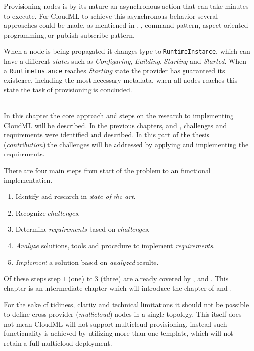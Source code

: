 Provisioning nodes is by its nature an asynchronous action that can take minutes to execute.
For CloudML to achieve this asynchronous behavior several approaches could be made,
as mentioned in , \eg, command pattern, aspect-oriented programming,
or publish-subscribe pattern.

When a node is being propagated it changes type to \texttt{RuntimeInstance}, 
which can have a different \emph{states} such as \emph{Configuring}, \emph{Building}, \emph{Starting} and \emph{Started}.
When a \texttt{RuntimeInstance} reaches \emph{Starting} state the provider has guaranteed its existence, including
the most necessary metadata, when all nodes reaches this state the task of provisioning is concluded.

\hr 

 \\
In this chapter the core approach and steps on the research to implementing CloudML will be described.
In the previous chapters,  and , 
challenges and requirements were identified and described.
In this part of the thesis (\emph{contribution}) the challenges will be addressed 
by applying and implementing the requirements.

There are four main steps from start of the problem to an functional implementation.
\begin{enumerate}
  \item Identify and research in \emph{state of the art}.
  \item Recognize \emph{challenges}.
  \item Determine \emph{requirements} based on \emph{challenges}.
  \item \emph{Analyze} solutions, tools and procedure to implement \emph{requirements}.
  \item \emph{Implement} a solution based on \emph{analyzed} results.
\end{enumerate}
Of these steps step $1$ (one) to $3$ (three) are already covered by 
,  and .
This chapter is an intermediate chapter which will introduce the chapter of 
and .


For the sake of tidiness, clarity and technical limitations it 
should not be possible to define cross-provider (\emph{multicloud}) nodes in a single topology.
This itself does not mean CloudML will not support multicloud provisioning,
instead such functionality is achieved by utilizing more than one template,
which will not retain a full multicloud deployment.

